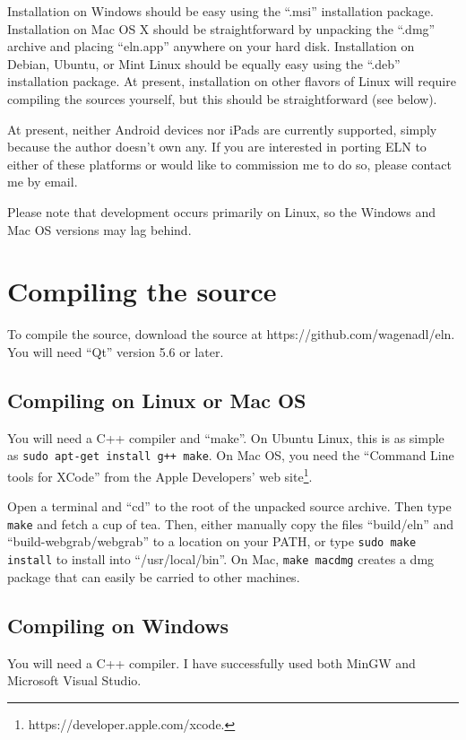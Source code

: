 \documentclass[11pt]{report}
\def\terminal#1{{\tt#1}}
\begin{document}
Installation on Windows should be easy using the ``.msi''
installation package. Installation on Mac OS X should be
straightforward by unpacking the ``.dmg'' archive and placing
``eln.app'' anywhere on your hard disk.  Installation on Debian,
Ubuntu, or Mint Linux should be equally easy using the
``.deb'' installation package. At present, installation on other
flavors of Linux will require compiling the sources yourself, but this
should be straightforward (see below).

At present, neither Android devices nor iPads are currently supported,
simply because the author doesn't own any. If you are interested in
porting ELN to either of these platforms or would like to commission
me to do so, please contact me by email.

Please note that development occurs primarily on Linux, so the Windows
and Mac OS versions may lag behind.

\section{Compiling the source}
To compile the source, download the source at https://github.com/wagenadl/eln. You will need
``Qt'' version 5.6 or later.

\subsection{Compiling on Linux or Mac OS}

You will need a C++ compiler and ``make''. On Ubuntu Linux, this is as simple
as \terminal{sudo apt-get install g++ make}. On Mac OS, you need the
``Command Line tools for XCode'' from the Apple Developers' web
site\footnote{https://developer.apple.com/xcode.}.

Open a terminal and ``cd'' to the root of the unpacked source
archive. Then type \terminal{make} and fetch a cup of tea. Then, either
manually copy the files ``build/eln'' and
``build-webgrab/webgrab'' to a location on your PATH, or type \terminal{sudo make
install} to install into ``/usr/local/bin''. On Mac, \terminal{make macdmg}
creates a dmg package that can easily be carried to other machines.

\subsection{Compiling on Windows}
You will need a C++ compiler. I have successfully used both MinGW and
Microsoft Visual Studio.
\end{document}
